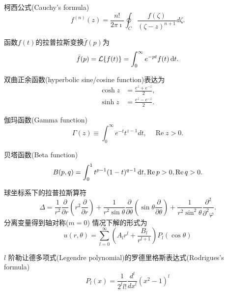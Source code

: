 \documentclass{njustexam}
\begin{document}
\vfill
\newpage
{} %
柯西公式(Cauchy's formula)
\[
  f^{(n)}(z) = \frac{n!}{2\pi \imath} \oint_C \frac{f(\zeta)}{(\zeta - z)^{n+1}} d \zeta. 
  \label{eq:cauchy_formula_nth_derivative}
\]

\bigskip
函数$f(t)$的拉普拉斯变换$\bar{f}(p)$为
\[
    \bar{f}(p) = \mathcal{L} \{ f(t) \} = \int_0 ^{\infty} e^{-pt} f(t) \mathop{}\!\mathrm{d} t . 
\]

\bigskip

双曲正余函数(hyperbolic sine/cosine function)表达为
\begin{align*}
    \cosh z&= \frac{e^{z} + e^{ - z} }{2} , 
    \\
    \sinh z &= \frac{e^{z} - e^{ - z} }{2} . 
\end{align*}

伽玛函数(Gamma function)
\[
  \Gamma(z) \equiv \int_{0}^{\infty} e^{-t} t^{z-1} d t,  \quad \operatorname{Re} z>0 . 
\]
\bigskip

贝塔函数(Beta function)
\[
    B(p,  q) = \int_0^1 t^{p -1} (1-t)^{q-1} \mathop{}\!\mathrm{d} t,  \operatorname{Re} p> 0,  \operatorname{Re} q >0. 
    \label{eq:beta_def1}
\]
\bigskip



球坐标系下的拉普拉斯算符
\[
 \Delta = \frac{1}{r^2} \frac{\partial}{\partial r} \left( r^2 \frac{\partial }{\partial r} \right)
  + \frac{1}{r^2\sin \theta} \frac{\partial}{\partial \theta} \left( \sin\theta \frac{\partial}{\partial \theta} \right)
  + \frac{1}{r^2\sin^2 \theta} \frac{\partial^2}{\partial^2 \varphi} .
\]
分离变量得到轴对称($m=0$)
情况下解的形式为
\[
  u(r,  \theta) = \sum_{l=0}^{\infty} \left( A_l r^l + \frac{B_l}{r^{l+1}} \right) P_{l} (\cos \theta)
\]

\bigskip

$l$ 阶勒让德多项式(Legendre polynomial)的罗德里格斯表达式(Rodrigues's formula) 
$$P_l(x)=\frac{1}{2^l l !} \frac{d^l}{d x^l}\left(x^2-1\right)^l$$
\end{document}

